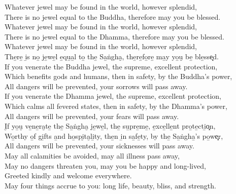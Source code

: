 \spewnotes

\clearpage

\englishText

\begin{onechants}
Whatever jewel may be found in the world, however splendid,\\
There is no jewel equal to the Buddha, therefore may you be blessed.\\
Whatever jewel may be found in the world, however splendid,\\
There is no jewel equal to the Dhamma, therefore may you be blessed.\\
Whatever jewel may be found in the world, however splendid,\\
The̱re̱ i̱s no̱ je̱we̱l e̱qu̱a̱l to̱ the̱ Sa̱ṅgha̮, the̱re̱fo̱re̱ ma̱y yo̱u̮ be̱ ble̱sse͓d.\\
If you venerate the Buddha jewel, the supreme, excellent protection,\\
Which benefits gods and humans, then in safety, by the Buddha's power,\\
All dangers will be prevented, your sorrows will pass away.\\
If you venerate the Dhamma jewel, the supreme, excellent protection,\\
Which calms all fevered states, then in safety, by the Dhamma's power,\\
All dangers will be prevented, your fears will pass away.\\
I̮f yo̱u̮ ve̱ne̱ra̮te̱ the̱ Sa̱ṅgha̮ je̱we̱l, the̱ su̱pre̱me̱, e̱xce̱lle̱nt pro̱te̱cti̱o͓n,\\
Wo̱rthy o̱f gi̱fts a̱nd ho̱spi̮ta̮li̱ty, the̱n i̱n sa̱fe̱ty, by the̱ Sa̱ṅgha̱'s po̱we͓r,\\
All dangers will be prevented, your sicknesses will pass away.\\
May all calamities be avoided, may all illness pass away,\\
May no dangers threaten you, may you be happy and long-lived,\\
Greeted kindly and welcome everywhere.\\
May four things accrue to you: long life, beauty, bliss, and strength.\\
\end{onechants}

\clearpage

\paliText

